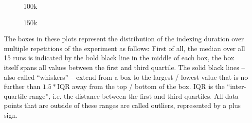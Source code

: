 \begin{figure}[h]
        \caption{100k}
        \label{fig:evaluation:performance:mean-durations-100k}
\end{figure}

\begin{figure}[h]
        \caption{150k}
        \label{fig:evaluation:performance:mean-durations-150k}
\end{figure}

The boxes in these plots represent the distribution of the indexing duration over multiple repetitions of the experiment as follows:
First of all, the median over all 15 runs is indicated by the bold black line in the middle of each box, the box itself spans all values between the first and third quartile.
The solid black lines -- also called ``whiskers'' -- extend from a box to the largest / lowest value that is no further than $ 1.5 * \text{IQR} $ away from the top / bottom of the box.
$\text{IQR}$ is the ``inter-quartile range'', i.e. the distance between the first and third quartiles.
All data points that are outside of these ranges are called outliers, represented by a plus sign.

